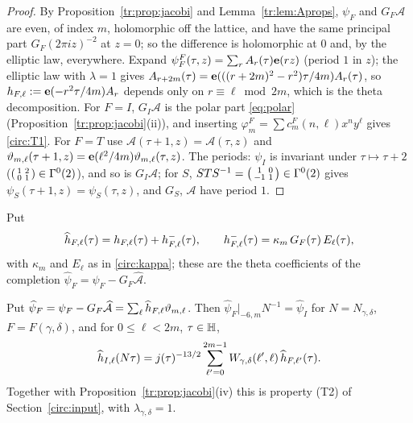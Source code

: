 \begin{proof}
By Proposition~\ref{tr:prop:jacobi} and Lemma~\ref{tr:lem:Aprops}, $\psi_F$ and $G_F\mathcal A$ are even, of index $m$, holomorphic off the lattice, and have the same principal part $G_F(2\pi iz)^{-2}$ at $z=0$; so the difference is holomorphic at $0$ and, by the elliptic law, everywhere. Expand $\psi^F_F(\tau,z)=\sum_rA_r(\tau)\mathbf e(rz)$ (period $1$ in $z$); the elliptic law with $\lambda=1$ gives $A_{r+2m}(\tau)=\mathbf e(((r+2m)^2-r^2)\tau/4m)A_r(\tau)$, so $h_{F,\ell}:=\mathbf e(-r^2\tau/4m)A_r$ depends only on $r\equiv\ell\bmod2m$, which is the theta decomposition. For $F=I$, $G_I\mathcal A$ is the polar part \eqref{eq:polar} (Proposition~\ref{tr:prop:jacobi}(ii)), and inserting $\varphi^F_m=\sum c^F_m(n,\ell)x^ny^\ell$ gives \eqref{circ:T1}. For $F=T$ use $\mathcal A(\tau+1,z)=\mathcal A(\tau,z)$ and $\vartheta_{m,\ell}(\tau+1,z)=\mathbf e(\ell^2/4m)\vartheta_{m,\ell}(\tau,z)$. The periods: $\psi_I$ is invariant under $\tau\mapsto\tau+2$ ($\begin{psmallmatrix}1&2\\0&1\end{psmallmatrix}\in\Gamma^0(2)$), and so is $G_I\mathcal A$; for $S$, $STS^{-1}=\begin{psmallmatrix}1&0\\-1&1\end{psmallmatrix}\in\Gamma^0(2)$ gives $\psi_S(\tau+1,z)=\psi_S(\tau,z)$, and $G_S$, $\mathcal A$ have period $1$.
\end{proof}

Put
\begin{equation}\label{circ:T2b}
\widehat h_{F,\ell}(\tau)=h_{F,\ell}(\tau)+h^-_{F,\ell}(\tau),\qquad h^-_{F,\ell}(\tau)=\kappa_m\,G_F(\tau)\,E_\ell(\tau),
\end{equation}
with $\kappa_m$ and $E_\ell$ as in \eqref{circ:kappa}; these are the theta coefficients of the completion $\widehat\psi_F=\psi_F-G_F\widehat{\mathcal A}$.

\begin{theorem}\label{tr:thm:T2}
Put $\widehat\psi_F=\psi_F-G_F\widehat{\mathcal A}=\sum_\ell\widehat h_{F,\ell}\vartheta_{m,\ell}$. Then $\widehat\psi_F|_{-6,m}N^{-1}=\widehat\psi_I$ for $N=N_{\gamma,\delta}$, $F=F(\gamma,\delta)$, and for $0\le\ell<2m$, $\tau\in\mathbb{H}$,
\[
\widehat h_{I,\ell}(N\tau)=j(\tau)^{-13/2}\sum_{\ell'=0}^{2m-1}W_{\gamma,\delta}(\ell',\ell)\,\widehat h_{F,\ell'}(\tau).
\]
Together with Proposition~\ref{tr:prop:jacobi}(iv) this is property \textup{(T2)} of Section~\ref{circ:input}, with $\lambda_{\gamma,\delta}=1$.
\end{theorem}

